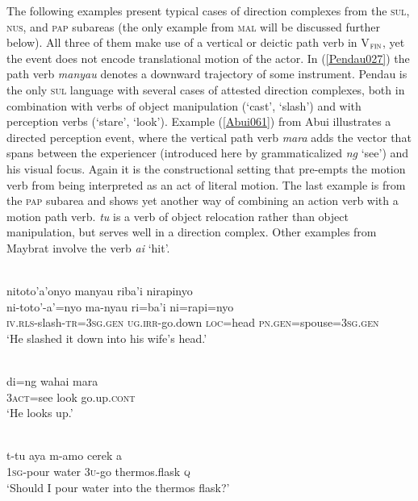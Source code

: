 The following examples present typical cases of direction complexes from the \textsc{sul}, \textsc{nus}, and \textsc{pap} subareas (the only example from \textsc{mal} will be discussed further below). All three of them make use of a vertical or deictic path verb in V$_{\textsc{fin}}$, yet the event does not encode translational motion of the actor. In (\ref{Pendau027}) the path verb \textit{manyau} denotes a downward trajectory of some instrument. Pendau is the only \textsc{sul} language with several cases of attested direction complexes, both in combination with verbs of object manipulation (`cast', `slash') and with perception verbs (`stare', `look'). Example (\ref{Abui061}) from Abui illustrates a directed perception event, where the vertical path verb \textit{mara} adds the vector that spans between the experiencer (introduced here by grammaticalized \textit{ng} `see') and his visual focus. Again it is the constructional setting that pre-empts the motion verb from being interpreted as an act of literal motion. The last example is from the \textsc{pap} subarea and shows yet another way of combining an action verb with a motion path verb. \textit{tu} is a verb of object relocation rather than object manipulation, but serves well in a direction complex. Other examples from Maybrat involve the verb \textit{ai} `hit'.

\ea \label{Pendau027}
\\
\glll nitoto'a'onyo manyau riba'i nirapinyo \\
ni-toto'-a'=nyo ma-nyau ri=ba'i ni=rapi=nyo \\
\textsc{iv}.\textsc{rls}-slash-\textsc{tr}=\textsc{3}\textsc{sg}.\textsc{gen} \textsc{ug}.\textsc{irr}-go.down \textsc{loc}=head \textsc{pn}.\textsc{gen}=spouse=\textsc{3}\textsc{sg}.\textsc{gen} \\
\glft `He slashed it down into his wife's head.' \\ 
\z

\ea \label{Abui061}
\\
\gll di=ng wahai mara \\
\textsc{3}\textsc{act}=see look go.up.\textsc{cont} \\
\glft ‘He looks up.’\\ 
\z
\xe

\ea \label{Maybrat102}
\\
\gll t-tu aya m-amo cerek a \\
\textsc{1}\textsc{sg}-pour water \textsc{3}\textsc{u}-go thermos.flask \textsc{q} \\
\glft `Should I pour water into the thermos flask?'\\ 
\z

